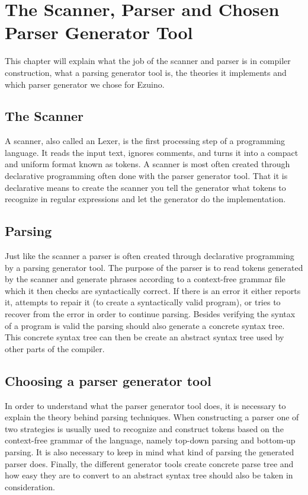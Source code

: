 \section{The Scanner, Parser and Chosen Parser Generator Tool}
This chapter will explain what the job of the scanner and parser is in compiler construction, what a parsing generator tool is, the theories it implements and which parser generator we chose for Ezuino.

\subsection{The Scanner}
A scanner, also called an Lexer, is the first processing step of a programming language. It reads the input text, ignores comments, and turns it into a compact and uniform format known as tokens. 
A scanner is most often created through declarative programming  often done with the parser generator tool. That it is declarative means to create the scanner you tell the generator what tokens to recognize in regular expressions and let the generator do the implementation. 

\label{parsing-subsubsection}
\subsection{Parsing}
Just like the scanner a parser is often created through declarative programming by a parsing generator tool. The purpose of the parser is to read tokens generated by the scanner and generate phrases according to a context-free grammar file which it then checks are syntactically correct. If there is an error it either reports it, attempts to repair it (to create a syntactically valid program), or tries to recover from the error in order to continue parsing. Besides  verifying the syntax of a program is valid the parsing should also generate a concrete syntax tree. This concrete syntax tree can then be create an abstract syntax tree used by other parts of the compiler.

\subsection{Choosing a parser generator tool}
In order to understand what the parser generator tool does, it is necessary to explain the theory behind parsing techniques. When constructing a parser one of two strategies is usually used to recognize and construct tokens based on the context-free grammar of the language, namely top-down parsing and bottom-up parsing. It is also necessary to keep in mind what kind of parsing the generated parser does. Finally, the different generator tools create concrete parse tree and how easy they are to convert to an abstract syntax tree should also be taken in consideration.
